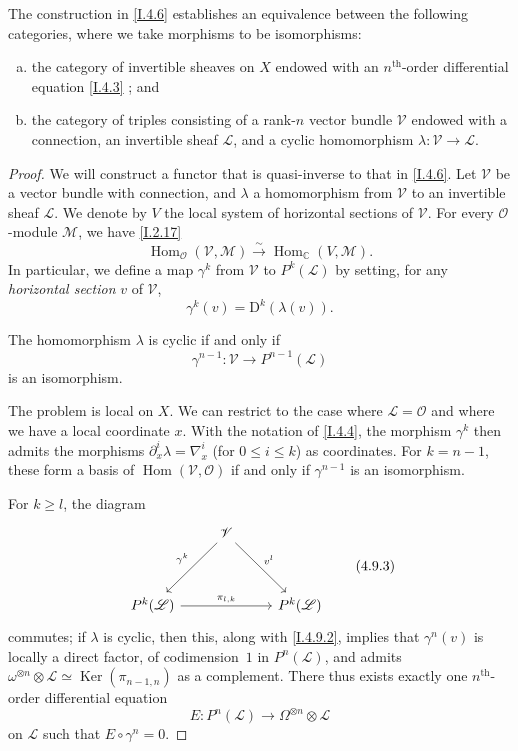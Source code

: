 \documentclass{report}
\theoremstyle{plain}
\newenvironment{proposition}[1]
    {\renewcommand\theinnercustomproposition{#1}\innercustomproposition}
    {\endinnercustomproposition}
\newenvironment{lemma}[1]
    {\renewcommand\theinnercustomlemma{#1}\innercustomlemma}
    {\endinnercustomlemma}
\theoremstyle{definition}
\newcommand{\sh}[1]{{\mathscr{#1}}}
\newcommand{\CC}{\mathbb{C}}
\newcommand{\DD}{\mathrm{D}}
\renewcommand{\geq}{\geqslant}
\renewcommand{\leq}{\leqslant}
\DeclareMathOperator{\Ker}{Ker}
\DeclareMathOperator{\Hom}{Hom}
\newcommand{\oldpage}[1]{\marginpar{\footnotesize$\Big\vert$ \textit{p.~#1}}}
\begin{document}
\begin{proposition}{4.9}
\label{I.4.9}
  The construction in \cref{I.4.6} establishes an equivalence between the following categories, where we take morphisms to be isomorphisms:
  \begin{enumerate}[a)]
    \item the category of invertible sheaves on $X$ endowed with an $n^\mathrm{th}$-order differential equation \cref{I.4.3} ; and
    \item the category of triples consisting of a rank-$n$ vector bundle $\sh{V}$ endowed with a connection, an invertible sheaf $\sh{L}$, and a cyclic homomorphism $\lambda\colon\sh{V}\to\sh{L}$.
  \end{enumerate}
\end{proposition}

\begin{proof}
  We will construct a functor that is quasi-inverse to that in \cref{I.4.6}.
  Let $\sh{V}$ be a vector bundle with connection, and $\lambda$ a homomorphism from $\sh{V}$ to an invertible sheaf $\sh{L}$.
  We denote by $V$ the local system of horizontal sections of $\sh{V}$.
  For every $\sh{O}$-module $\sh{M}$, we have \cref{I.2.17}
  \[
    \Hom_\sh{O}(\sh{V},\sh{M}) \xrightarrow{\sim} \Hom_\CC(V,\sh{M}).
  \]
  In particular, we define a map $\gamma^k$ from $\sh{V}$ to $P^k(\sh{L})$ by setting, for any \emph{horizontal section} $v$ of $\sh{V}$,
  \[
  \label{I.4.9.1}
    \gamma^k(v) = \DD^k(\lambda(v)).
  \tag{4.9.1}
  \]

  \begin{lemma}{4.9.2}
  \label{I.4.9.2}
    The homomorphism $\lambda$ is cyclic if and only if
    \[
      \gamma^{n-1}\colon \sh{V} \to P^{n-1}(\sh{L})
    \]
    is an isomorphism.
  \end{lemma}

  The problem is local on $X$.
  We can restrict to the case where $\sh{L}=\sh{O}$ and where we have a local coordinate $x$.
  With the notation of \cref{I.4.4}, the morphism $\gamma^k$ then admits the morphisms $\partial_x^i\lambda = \nabla_x^i$ (for $0\leq i\leq k$) as coordinates.
  For $k=n-1$, these form a basis of $\Hom(\sh{V},\sh{O})$ if and only if $\gamma^{n-1}$ is an isomorphism.

  For $k\geq l$, the diagram
\oldpage{28}
  \[
  \label{I.4.9.3}
    \begin{tikzcd}[row sep=huge]
      & \sh{V} \dlar[swap,"\gamma^k"] \drar["v^l"] &
    \\P^k(\sh{L}) \ar[rr,"\pi_{l,k}"] && P^k(\sh{L})
    \end{tikzcd}
  \tag{4.9.3}
  \]
  commutes;
  if $\lambda$ is cyclic, then this, along with \cref{I.4.9.2}, implies that $\gamma^n(v)$ is locally a direct factor, of codimension~$1$ in $P^n(\sh{L})$, and admits $\omega^{\otimes n}\otimes\sh{L} \simeq \Ker(\pi_{n-1,n})$ as a complement.
  There thus exists exactly one $n^\mathrm{th}$-order differential equation
  \[
    E\colon P^n(\sh{L}) \to \Omega^{\otimes n}\otimes\sh{L}
  \]
  on $\sh{L}$ such that $E\circ\gamma^n=0$.


\end{proof}
\end{document}
